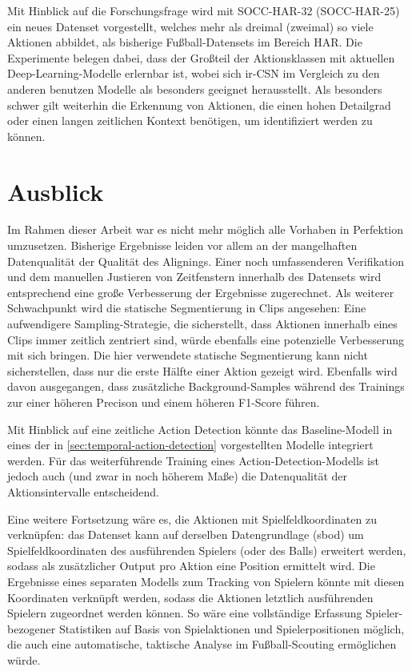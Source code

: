 Mit Hinblick auf die Forschungsfrage wird mit SOCC-HAR-32 (\bzw SOCC-HAR-25) ein neues Datenset vorgestellt, welches mehr als dreimal (\bzw zweimal) so viele Aktionen abbildet, als bisherige Fußball-Datensets im Bereich HAR.
Die Experimente belegen dabei, dass der Großteil der Aktionsklassen mit aktuellen Deep-Learning-Modelle erlernbar ist, wobei sich ir-CSN im Vergleich zu den anderen benutzen Modelle als besonders geeignet herausstellt.
Als besonders schwer gilt weiterhin die Erkennung von Aktionen, die einen hohen Detailgrad oder einen langen zeitlichen Kontext benötigen, um identifiziert werden zu können.

\section{Ausblick}
\label{sec:ausblick}

Im Rahmen dieser Arbeit war es nicht mehr möglich alle Vorhaben in Perfektion umzusetzen.
Bisherige Ergebnisse leiden vor allem an der mangelhaften Datenqualität \bzw der Qualität des Alignings.
Einer noch umfassenderen Verifikation und dem manuellen Justieren von Zeitfenstern innerhalb des Datensets wird entsprechend eine große Verbesserung der Ergebnisse zugerechnet.
Als weiterer Schwachpunkt wird die statische Segmentierung in Clips angesehen:
Eine aufwendigere Sampling-Strategie, die sicherstellt, dass Aktionen innerhalb eines Clips immer zeitlich zentriert sind, würde ebenfalls eine potenzielle Verbesserung mit sich bringen.
Die hier verwendete statische Segmentierung kann \zB nicht sicherstellen, dass nur die erste Hälfte einer Aktion gezeigt wird.
Ebenfalls wird davon ausgegangen, dass zusätzliche Background-Samples während des Trainings zur einer höheren Precison und einem höheren F1-Score führen.

Mit Hinblick auf eine zeitliche Action Detection könnte das Baseline-Modell in eines der in \autoref{sec:temporal-action-detection} vorgestellten Modelle integriert werden.
Für das weiterführende Training eines Action-Detection-Modells ist jedoch auch (und zwar in noch höherem Maße) die Datenqualität der Aktionsintervalle entscheidend.

Eine weitere Fortsetzung wäre es, die Aktionen mit Spielfeldkoordinaten zu verknüpfen:
das Datenset kann auf derselben Datengrundlage (\gls{sbod}) um Spielfeldkoordinaten des ausführenden Spielers (oder des Balls) erweitert werden, sodass als zusätzlicher Output pro Aktion eine Position ermittelt wird.
Die Ergebnisse eines separaten Modells zum Tracking von Spielern könnte mit diesen Koordinaten verknüpft werden, sodass die Aktionen letztlich ausführenden Spielern zugeordnet werden können.
So wäre eine vollständige Erfassung Spieler-bezogener Statistiken auf Basis von Spielaktionen und Spielerpositionen möglich, die auch eine automatische, taktische Analyse im Fußball-Scouting ermöglichen würde.

